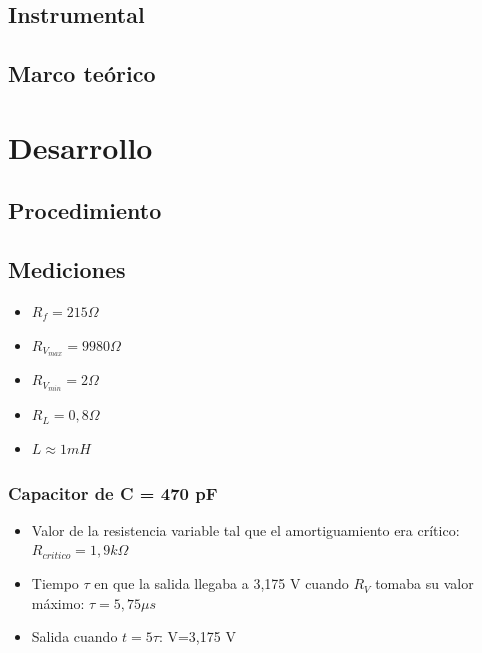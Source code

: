 \documentclass{article}
\begin{document}
    \subsection{Instrumental}
    \subsection{Marco teórico}

\section{Desarrollo}
    \subsection{Procedimiento}
    \subsection{Mediciones}
 
        \begin{itemize}
            \item $ R_f = 215 \Omega $
            \item $ R_{V_{max}} = 9980 \Omega $
            \item $ R_{V_{min}} = 2 \Omega $
            \item $ R_L = 0,8 \Omega $
            \item $ L \approx 1 mH $
        \end{itemize}
        
        \par
        \subsubsection*{Capacitor de C = 470 pF}
            \begin{itemize}
                \item Valor de la resistencia variable tal que el amortiguamiento era crítico: $ R_{critico} = 1,9 k\Omega $
                \item Tiempo $\tau$ en que la salida llegaba a 3,175 V cuando $ R_V $ tomaba su valor máximo: $ \tau = 5,75 \mu s$
                \item Salida cuando $t=5\tau$: V=3,175 V
            \end{itemize}

        \par
\end{document}
